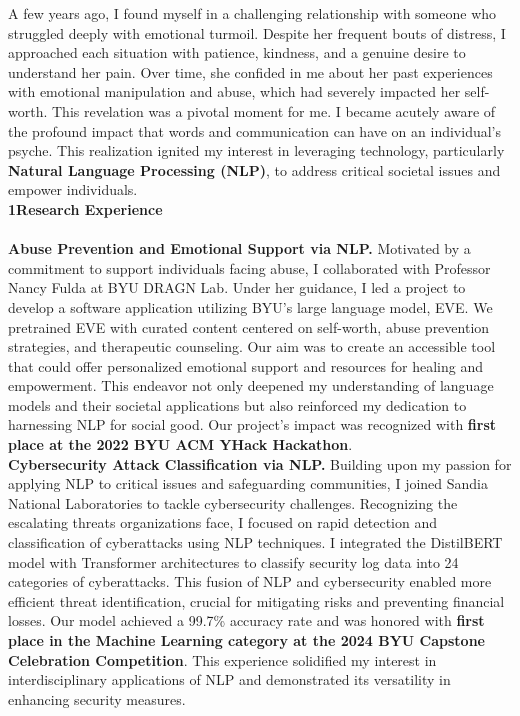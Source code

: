 \documentclass{article}
\begin{document}
A few years ago, I found myself in a challenging relationship with someone who struggled deeply with emotional turmoil. Despite her frequent bouts of distress, I approached each situation with patience, kindness, and a genuine desire to understand her pain. Over time, she confided in me about her past experiences with emotional manipulation and abuse, which had severely impacted her self-worth. This revelation was a pivotal moment for me. I became acutely aware of the profound impact that words and communication can have on an individual's psyche. This realization ignited my interest in leveraging technology, particularly \textbf{Natural Language Processing (NLP)}, to address critical societal issues and empower individuals.
\\

\Large\textbf{1\hspace{1em}Research Experience}\normalsize
\\
\\
\textbf{Abuse Prevention and Emotional Support via NLP.} Motivated by a commitment to support individuals facing abuse, I collaborated with Professor Nancy Fulda at BYU DRAGN Lab. Under her guidance, I led a project to develop a software application utilizing BYU's large language model, EVE. We pretrained EVE with curated content centered on self-worth, abuse prevention strategies, and therapeutic counseling. Our aim was to create an accessible tool that could offer personalized emotional support and resources for healing and empowerment. This endeavor not only deepened my understanding of language models and their societal applications but also reinforced my dedication to harnessing NLP for social good. Our project's impact was recognized with \textbf{first place at the 2022 BYU ACM YHack Hackathon}\cite{byuacm2022}.
\\

\textbf{Cybersecurity Attack Classification via NLP.} Building upon my passion for applying NLP to critical issues and safeguarding communities, I joined Sandia National Laboratories to tackle cybersecurity challenges. Recognizing the escalating threats organizations face, I focused on rapid detection and classification of cyberattacks using NLP techniques. I integrated the DistilBERT model with Transformer architectures to classify security log data into 24 categories of cyberattacks\cite{kim2024llm}. This fusion of NLP and cybersecurity enabled more efficient threat identification, crucial for mitigating risks and preventing financial losses. Our model achieved a 99.7\% accuracy rate and was honored with \textbf{first place in the Machine Learning category at the 2024 BYU Capstone Celebration Competition}\cite{cybersecurity}. This experience solidified my interest in interdisciplinary applications of NLP and demonstrated its versatility in enhancing security measures.
\\
\end{document}
